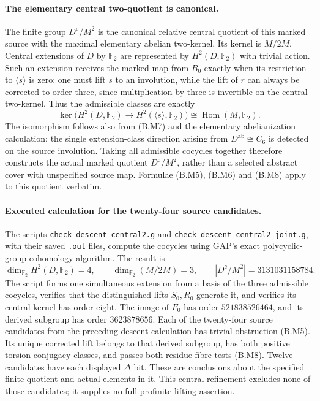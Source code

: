 \paragraph{The elementary central two-quotient is canonical.}
The finite group $D^{\mathrm c}/M^2$ is the canonical
relative central quotient of this marked source with the
maximal elementary abelian two-kernel.  Its kernel is
$M/2M$.  Central
extensions of $D$ by $\mathbb F_2$ are represented by
$H^2(D,\mathbb F_2)$ with trivial action.  Such an extension
receives the marked map from $B_0$ exactly when its
restriction to $\langle\overline s\rangle$ is zero:
one must lift $s$ to an involution, while the lift of $r$
can always be corrected to order three, since multiplication
by three is invertible on the central two-kernel.
Thus the admissible classes are exactly
\[
 \ker\bigl(H^2(D,\mathbb F_2)\longrightarrow
 H^2(\langle\overline s\rangle,\mathbb F_2)\bigr)
       \cong\operatorname{Hom}(M,\mathbb F_2).  \tag{B.M9}
\]
The isomorphism follows also from (B.M7) and the elementary
abelianization calculation: the single extension-class
direction arising from $D^{\mathrm{ab}}\cong C_6$ is
detected on the source involution.  Taking all admissible
cocycles together therefore constructs the actual marked
quotient $D^{\mathrm c}/M^2$, rather than a selected abstract
cover with unspecified source map.  Formulae (B.M5),
(B.M6) and (B.M8) apply to this quotient verbatim.

\paragraph{Executed calculation for the twenty-four source candidates.}
The scripts \texttt{check\_descent\_central2.g} and
\texttt{check\_descent\_central2\_joint.g}, with their saved
\texttt{.out} files, compute the cocycles using GAP's exact
polycyclic-group cohomology algorithm.  The result is
\[
 \dim_{\mathbb F_2}H^2(D,\mathbb F_2)=4,
 \qquad \dim_{\mathbb F_2}(M/2M)=3,
 \qquad |D^{\mathrm c}/M^2|=3131031158784.        \tag{B.M10}
\]
The script forms one simultaneous extension from a basis
of the three admissible cocycles, verifies that the
distinguished lifts $S_0,R_0$ generate it, and verifies its
central kernel has order eight.  The image of $F_0$ has
order $521838526464$, and its derived subgroup has order
$3623878656$.  Each of the twenty-four source candidates
from the preceding descent calculation has trivial
obstruction (B.M5).  Its unique corrected lift belongs
to that derived subgroup, has both positive torsion
conjugacy classes, and passes both residue-fibre tests
(B.M8).  Twelve candidates have each displayed $\Delta$
bit.  These are conclusions about the specified finite
quotient and actual elements in it.  This central
refinement excludes none of those candidates; it supplies
no full profinite lifting assertion.

